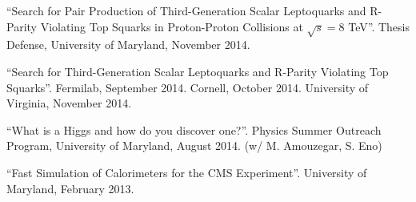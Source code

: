 \begin{description}[leftmargin=12pt,font=\normalfont,labelsep=0em]
\item ``Search for Pair Production of Third-Generation Scalar Leptoquarks and R-Parity Violating Top Squarks in Proton-Proton Collisions at $\sqrt{s}=8$ TeV''. Thesis Defense, University of Maryland, November 2014.
\item ``Search for Third-Generation Scalar Leptoquarks and R-Parity Violating Top Squarks''. Fermilab, September 2014. Cornell, October 2014. University of Virginia, November 2014.
\item ``What is a Higgs and how do you discover one?''. Physics Summer Outreach Program, University of Maryland, August 2014. (w/ M. Amouzegar, S. Eno)
\item ``Fast Simulation of Calorimeters for the CMS Experiment''. University of Maryland, February 2013.
\end{description}

\ifdefined\longflag
